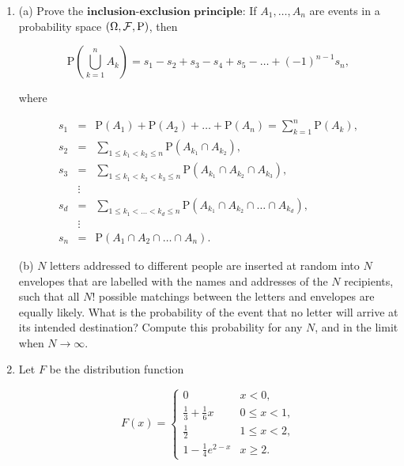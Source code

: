 \begin{enumerate}[label=\arabic*.]
\[
\mathrm{P}(X \ge t\ |\ X \ge s) = \mathrm{P}(X \ge t-s)\qquad \textrm{ for all $0<s<t$}.
\]

\noindent Prove that exponential random variables have the lack
of memory property.

(d) Prove that any non-negative random variable that
has the lack of memory property has the exponential
distribution with some parameter $\lambda>0$. (This
is easier if one assumes that the function
$G(x)=\mathrm{P}(X\ge x)$ is differentiable on
$[0,\infty)$, so you can make this assumption if you
fail to find a more general argument).

\item (a) Prove the
$\textbf{inclusion-exclusion principle}$: If
$A_1,\ldots,A_n$ are events in a probability space
$(\Omega, {\cal F}, \mathrm{P})$, then

\[
\mathrm{P}\left(\bigcup_{k=1}^n A_k\right) = s_1 - s_2 + s_3 - s_4 + s_5 - \ldots + (-1)^{n-1} s_n,
\]

\noindent where

\begin{eqnarray*}
s_1 &=& \mathrm{P}(A_1) + \mathrm{P}(A_2) + \ldots + \mathrm{P}(A_n) = \sum_{k=1}^n \mathrm{P}(A_k), \\
s_2 &=& \sum_{1\le k_1 < k_2 \le n} \mathrm{P}(A_{k_1} \cap A_{k_2}), \\
s_3 &=& \sum_{1\le k_1 < k_2 < k_3 \le n} \mathrm{P}(A_{k_1} \cap A_{k_2} \cap A_{k_3}), \\
& \vdots &  \\
s_d &=& \sum_{1\le k_1 < \ldots< k_d \le n} \mathrm{P}(A_{k_1} \cap A_{k_2} \cap \ldots \cap A_{k_d}), \\
& \vdots &\\
s_n &=& \mathrm{P}(A_1 \cap A_2 \cap \ldots \cap A_n).
\end{eqnarray*}

\noindent (b) $N$ letters addressed to different people are
inserted at random into $N$ envelopes that are
labelled with the names and addresses of the $N$
recipients, such that all $N!$ possible matchings
between the letters and envelopes are equally likely.
What is the probability of the event that no letter
will arrive at its intended destination? Compute this
probability for any $N$, and in the limit when
$N\to\infty$.

\item Let $F$ be the distribution function

\[
F(x) = \begin{cases}
0 & x < 0, \\
\frac13 + \frac16 x & 0\le x < 1, \\
\frac12 & 1\le x < 2, \\
1-\frac14e^{2-x} & x\ge 2.
\end{cases}
\]


\end{enumerate}
